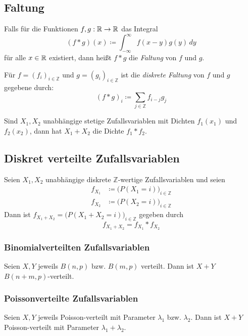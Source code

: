 		\subsection{Faltung}
			Falls für die Funktionen \( f, g : \mathbb{R} \rightarrow \mathbb{R} \) das Integral
			\begin{equation*}
				(f \ast g)(x) \coloneqq \int_{-\infty}^{\infty} \! f(x - y) g(y) \, dy
			\end{equation*}
			für alle \(x \in \mathbb{R}\) existiert, dann heißt \( f \ast g \) die \textit{Faltung} von \(f\) und \(g\).

			Für \( f = (f_i) _ { i \in \mathbb{Z} } \) und \( g = (g_i)_{i \in \mathbb{Z}} \) ist die \textit{diskrete Faltung} von \(f\) und \(g\) gegebene durch:
			\begin{equation*}
				(f \ast g)_i \coloneqq \sum_{j \in \mathbb{Z}} f_{i - j} g_j
			\end{equation*}

			Sind \( X_1, X_2 \) unabhängige stetige Zufallsvariablen mit Dichten \( f_1(x_1) \) und \( f_2(x_2) \), dann hat \( X_1 + X_2 \) die Dichte \( f_1 \ast f_2 \).

		\subsection{Diskret verteilte Zufallsvariablen}
			Seien \( X_1, X_2 \) unabhängige diskrete \( \mathbb{Z} \)-wertige Zufallsvariablen und seien
			\begin{align*}
				f_{X_1} & \coloneqq \big( P(X_1 = i) \big) _ { i \in \mathbb{Z} } \\
				f_{X_2} & \coloneqq \big( P(X_2 = i) \big) _ { i \in \mathbb{Z} }
			\end{align*}
			Dann ist \( f_{X_1 + X_2} = \big( P(X_1 + X_2 = i) \big)_{i \in \mathbb{Z}} \) gegeben durch
			\begin{equation*}
				f_{X_1 + X_2} = f_{X_1} \ast f_{X_2}
			\end{equation*}

			\subsubsection{Binomialverteilten Zufallsvariablen}
				Seien \(X, Y\) jeweils \( B(n, p) \) bzw. \( B(m, p) \) verteilt. Dann ist \( X + Y \) \( B(n + m, p) \)-verteilt.

			\subsubsection{Poissonverteilte Zufallsvariablen}
				Seien \(X, Y\) jeweils Poisson-verteilt mit Parameter \( \lambda_1 \) bzw. \( \lambda_2 \). Dann ist \( X + Y \) Poisson-verteilt mit Parameter \( \lambda_1 + \lambda_2 \).

